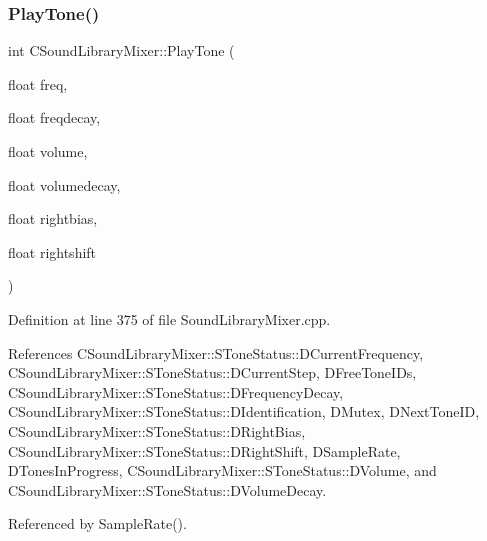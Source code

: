\subsubsection{\texorpdfstring{Play\+Tone()}{PlayTone()}}
{\footnotesize\ttfamily int C\+Sound\+Library\+Mixer\+::\+Play\+Tone (\begin{DoxyParamCaption}\item[{float}]{freq,  }\item[{float}]{freqdecay,  }\item[{float}]{volume,  }\item[{float}]{volumedecay,  }\item[{float}]{rightbias,  }\item[{float}]{rightshift }\end{DoxyParamCaption})}



Definition at line 375 of file Sound\+Library\+Mixer.\+cpp.



References C\+Sound\+Library\+Mixer\+::\+S\+Tone\+Status\+::\+D\+Current\+Frequency, C\+Sound\+Library\+Mixer\+::\+S\+Tone\+Status\+::\+D\+Current\+Step, D\+Free\+Tone\+I\+Ds, C\+Sound\+Library\+Mixer\+::\+S\+Tone\+Status\+::\+D\+Frequency\+Decay, C\+Sound\+Library\+Mixer\+::\+S\+Tone\+Status\+::\+D\+Identification, D\+Mutex, D\+Next\+Tone\+ID, C\+Sound\+Library\+Mixer\+::\+S\+Tone\+Status\+::\+D\+Right\+Bias, C\+Sound\+Library\+Mixer\+::\+S\+Tone\+Status\+::\+D\+Right\+Shift, D\+Sample\+Rate, D\+Tones\+In\+Progress, C\+Sound\+Library\+Mixer\+::\+S\+Tone\+Status\+::\+D\+Volume, and C\+Sound\+Library\+Mixer\+::\+S\+Tone\+Status\+::\+D\+Volume\+Decay.



Referenced by Sample\+Rate().


